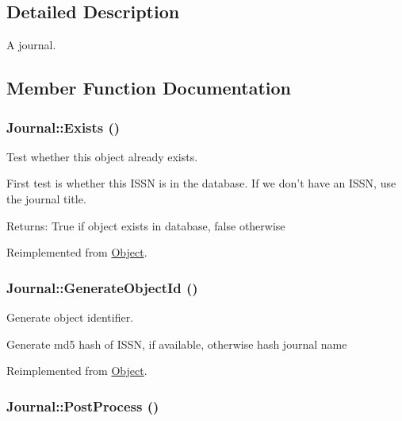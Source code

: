 \subsection{Detailed Description}
A journal. 

\subsection{Member Function Documentation}
\hypertarget{class_journal_972ce1a8531e15757579826aca9f8e49}{
\subsubsection{\setlength{\rightskip}{0pt plus 5cm}Journal::Exists ()}}
\label{class_journal_972ce1a8531e15757579826aca9f8e49}


Test whether this object already exists. 

First test is whether this ISSN is in the database. If we don't have an ISSN, use the journal title.

\begin{Desc}
\item[Returns:]True if object exists in database, false otherwise \end{Desc}


Reimplemented from \hyperlink{class_object_740e3ddfc03f8d18826fe6ed67344f0f}{Object}.\hypertarget{class_journal_d28269cb6daa116d9c26ad91ee0d08f7}{
\subsubsection{\setlength{\rightskip}{0pt plus 5cm}Journal::GenerateObjectId ()}}
\label{class_journal_d28269cb6daa116d9c26ad91ee0d08f7}


Generate object identifier. 

Generate md5 hash of ISSN, if available, otherwise hash journal name 

Reimplemented from \hyperlink{class_object_291597e1743bd57c40b8b49ae676e940}{Object}.\hypertarget{class_journal_d1beb0e9bc12b0cc585180aab4e1bdad}{
\subsubsection{\setlength{\rightskip}{0pt plus 5cm}Journal::PostProcess ()}}
\label{class_journal_d1beb0e9bc12b0cc585180aab4e1bdad}


